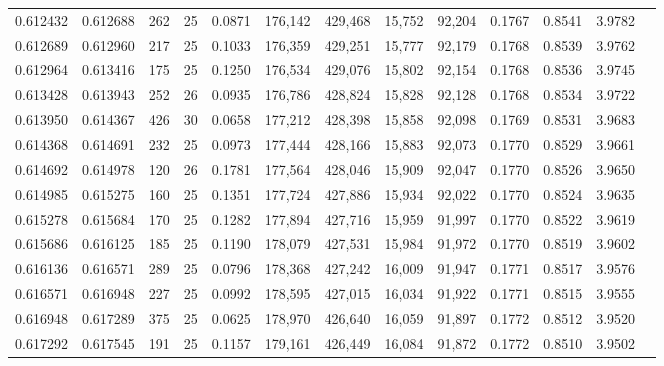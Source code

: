 \begin{tabular}{rrrrrrrrrrrrr}
0.612432 & 0.612688 &   262 &  25 &                                     0.0871 & 176,142 & 429,468 &  15,752 &  92,204 & 0.1767 & 0.8541 & 3.9782 \\
0.612689 & 0.612960 &   217 &  25 &                                     0.1033 & 176,359 & 429,251 &  15,777 &  92,179 & 0.1768 & 0.8539 & 3.9762 \\
0.612964 & 0.613416 &   175 &  25 &                                     0.1250 & 176,534 & 429,076 &  15,802 &  92,154 & 0.1768 & 0.8536 & 3.9745 \\
0.613428 & 0.613943 &   252 &  26 &                                     0.0935 & 176,786 & 428,824 &  15,828 &  92,128 & 0.1768 & 0.8534 & 3.9722 \\
0.613950 & 0.614367 &   426 &  30 &                                     0.0658 & 177,212 & 428,398 &  15,858 &  92,098 & 0.1769 & 0.8531 & 3.9683 \\
0.614368 & 0.614691 &   232 &  25 &                                     0.0973 & 177,444 & 428,166 &  15,883 &  92,073 & 0.1770 & 0.8529 & 3.9661 \\
0.614692 & 0.614978 &   120 &  26 &                                     0.1781 & 177,564 & 428,046 &  15,909 &  92,047 & 0.1770 & 0.8526 & 3.9650 \\
0.614985 & 0.615275 &   160 &  25 &                                     0.1351 & 177,724 & 427,886 &  15,934 &  92,022 & 0.1770 & 0.8524 & 3.9635 \\
0.615278 & 0.615684 &   170 &  25 &                                     0.1282 & 177,894 & 427,716 &  15,959 &  91,997 & 0.1770 & 0.8522 & 3.9619 \\
0.615686 & 0.616125 &   185 &  25 &                                     0.1190 & 178,079 & 427,531 &  15,984 &  91,972 & 0.1770 & 0.8519 & 3.9602 \\
0.616136 & 0.616571 &   289 &  25 &                                     0.0796 & 178,368 & 427,242 &  16,009 &  91,947 & 0.1771 & 0.8517 & 3.9576 \\
0.616571 & 0.616948 &   227 &  25 &                                     0.0992 & 178,595 & 427,015 &  16,034 &  91,922 & 0.1771 & 0.8515 & 3.9555 \\
0.616948 & 0.617289 &   375 &  25 &                                     0.0625 & 178,970 & 426,640 &  16,059 &  91,897 & 0.1772 & 0.8512 & 3.9520 \\
0.617292 & 0.617545 &   191 &  25 &                                     0.1157 & 179,161 & 426,449 &  16,084 &  91,872 & 0.1772 & 0.8510 & 3.9502 \\

\end{tabular}
